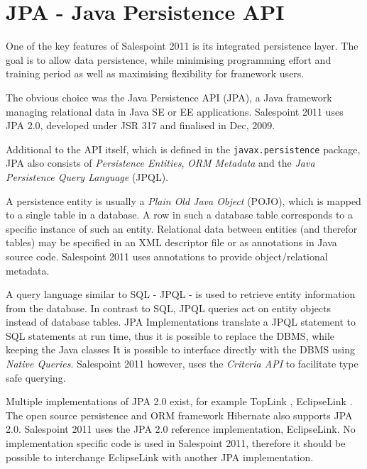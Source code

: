 \section{JPA - Java Persistence API}
One of the key features of Salespoint 2011 is its integrated persistence layer. The goal is to allow data persistence, while minimising programming effort and training period as well as maximising flexibility for framework users.

The obvious choice was the Java Persistence API (JPA), a Java framework managing relational data in Java SE or EE applications. Salespoint 2011 uses JPA 2.0, developed under JSR 317 and finalised in Dec, 2009.

Additional to the API itself, which is defined in the \texttt{javax.persistence} package, JPA also consists of \textit{Persistence Entities}, \textit{ORM Metadata} and the \textit{Java Persistence Query Language} (JPQL).

A persistence entity is usually a \textit{Plain Old Java Object} (POJO), which is mapped to a single table in a database.
A row in such a database table corresponds to a specific instance of such an entity.
Relational data between entities (and therefor tables) may be specified in an XML descriptor file or as annotations in Java source code.
Salespoint 2011 uses annotations to provide object/relational metadata.

A query language similar to SQL - JPQL - is used to retrieve entity information from the database.
In contrast to SQL, JPQL queries act on entity objects instead of database tables.
JPA Implementations translate a JPQL statement to SQL statements at run time, thus it is possible to replace the DBMS, while keeping the Java classes
It is possible to interface directly with the DBMS using \textit{Native Queries}.
Salespoint 2011 however, uses the \textit{Criteria API} to facilitate type safe querying.

Multiple implementations of JPA 2.0 exist, for example TopLink \cite{toplink}, EclipseLink \cite{eclipselink}.
The open source persistence and ORM framework Hibernate \cite{hibernate} also supports JPA 2.0.
Salespoint 2011 uses the JPA 2.0 reference implementation, EclipseLink.
No implementation specific code is used in Salespoint 2011, therefore it should be possible to interchange EclipseLink with another JPA implementation.
